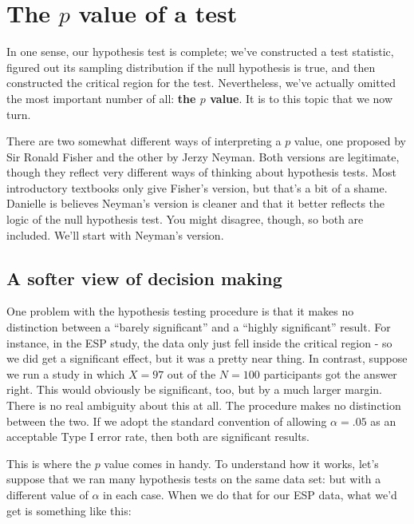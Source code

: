 \documentclass[
  11pt,
  a4paper,
  twoside,symmetric,openright]{book}
\theoremstyle{break}
\theoremstyle{break}
\begin{document}
\section{\texorpdfstring{The \(p\) value of a test}{The p value of a test}}\label{pvalue}

In one sense, our hypothesis test is complete; we've constructed a test statistic, figured out its sampling distribution if the null hypothesis is true, and then constructed the critical region for the test. Nevertheless, we've actually omitted the most important number of all: \textbf{the \(p\) value}. It is to this topic that we now turn.

There are two somewhat different ways of interpreting a \(p\) value, one proposed by Sir Ronald Fisher and the other by Jerzy Neyman. Both versions are legitimate, though they reflect very different ways of thinking about hypothesis tests. Most introductory textbooks only give Fisher's version, but that's a bit of a shame. Danielle is believes Neyman's version is cleaner and that it better reflects the logic of the null hypothesis test. You might disagree, though, so both are included. We'll start with Neyman's version.

\subsection{A softer view of decision making}\label{a-softer-view-of-decision-making}

One problem with the hypothesis testing procedure is that it makes no distinction between a ``barely significant'' and a ``highly significant'' result. For instance, in the ESP study, the data only just fell inside the critical region - so we did get a significant effect, but it was a pretty near thing. In contrast, suppose we run a study in which \(X=97\) out of the \(N=100\) participants got the answer right. This would obviously be significant, too, but by a much larger margin. There is no real ambiguity about this at all. The procedure makes no distinction between the two. If we adopt the standard convention of allowing \(\alpha = .05\) as an acceptable Type I error rate, then both are significant results.

This is where the \(p\) value comes in handy. To understand how it works, let's suppose that we ran many hypothesis tests on the same data set: but with a different value of \(\alpha\) in each case. When we do that for our ESP data, what we'd get is something like this:
\end{document}
